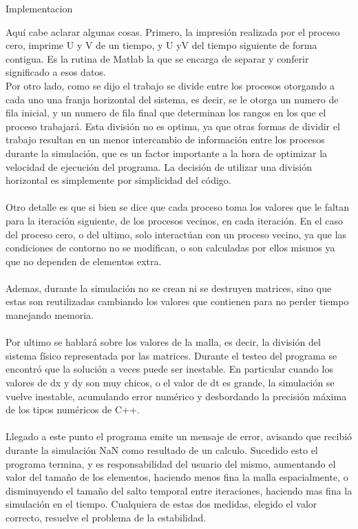 \begin{section}{Implementacion}
\begin{itemize}
Aquí cabe aclarar algunas cosas. Primero, la impresión realizada por el proceso cero, imprime U y V de un tiempo, y U yV del tiempo siguiente de forma contigua. Es la rutina de Matlab la que se encarga de separar y conferir significado a esos datos. 
~\\
Por otro lado, como se dijo el trabajo se divide entre los procesos otorgando a cada uno una franja horizontal del sistema, es decir, se le otorga un numero de fila inicial, y un numero de fila final que determinan los rangos en los que el proceso trabajará. Esta división no es optima, ya que otras formas de dividir el trabajo resultan en un menor intercambio de información entre los procesos durante la simulación, que es un factor importante a la hora de optimizar la velocidad de ejecución del programa. La decisión de utilizar una división horizontal es simplemente por simplicidad del código.
~\\
~\\
Otro detalle es que si bien se dice que cada proceso toma los valores que le faltan para la iteración siguiente, de los procesos vecinos, en cada iteración. En el caso del proceso cero, o del ultimo, solo interactúan con un proceso vecino, ya que las condiciones de contorno no se modifican, o son calculadas por ellos mismos ya que no dependen de elementos extra.
~\\
~\\ Ademas, durante la simulación no se crean ni se destruyen matrices, sino que estas son reutilizadas cambiando los valores que contienen para no perder tiempo manejando memoria.
~\\
~\\
Por ultimo se hablará sobre los valores de la malla, es decir, la división del sistema físico representada por las matrices. Durante el testeo del programa se encontró que la solución a veces puede ser inestable. En particular cuando los valores de dx y dy son muy chicos, o el valor de dt es grande, la simulación se vuelve inestable, acumulando error numérico y desbordando la precisión máxima de los tipos numéricos de C++. 
~\\
~\\
Llegado a este punto el programa emite un mensaje de error, avisando que recibió durante la simulación NaN como resultado de un calculo. Sucedido esto el programa termina, y es responsabilidad del usuario del mismo, aumentando el valor del tamaño de los elementos, haciendo menos fina la malla espacialmente, o disminuyendo el tamaño del salto temporal entre iteraciones, haciendo mas fina la simulación en el tiempo. Cualquiera de estas dos medidas, elegido el valor correcto, resuelve el problema de la estabilidad. 

\end{itemize}
\end{section}
